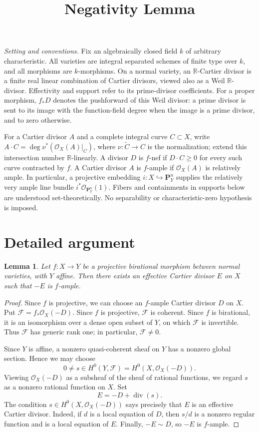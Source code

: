 \documentclass[12pt,a4paper,psamsfonts]{amsart}
\title[Negativity Lemma]{Negativity Lemma}
\author{}
\date{}
\theoremstyle{plain}
\newtheorem{lemma}[theorem]{Lemma}
\theoremstyle{definition}
\newcommand{\R}{\mathbb R}
\newcommand{\OO}{\mathcal O}
\begin{document}
\maketitle
{}

\noindent\textit{Setting and conventions.}
Fix an algebraically closed field $k$ of arbitrary characteristic.
All varieties are integral separated schemes of finite type over $k$,
and all morphisms are $k$-morphisms. On a normal variety, an
$\R$-Cartier divisor is a finite real linear combination of Cartier
divisors, viewed also as a Weil $\R$-divisor. Effectivity and support
refer to its prime-divisor coefficients. For a proper morphism,
$f_*D$ denotes the pushforward of this Weil divisor: a prime divisor
is sent to its image with the function-field degree when the image
is a prime divisor, and to zero otherwise.

For a Cartier divisor $A$ and a complete integral curve $C\subset X$,
write $A\cdot C=\deg\nu^*(\OO_X(A)|_C)$, where
$\nu\colon\widetilde C\to C$ is the normalization; extend this
intersection number $\R$-linearly. A divisor $D$ is $f$-nef if
$D\cdot C\geq0$ for every such curve contracted by $f$.
A Cartier divisor $A$ is $f$-ample if $\OO_X(A)$ is relatively ample.
In particular, a projective embedding
$i\colon X\hookrightarrow\mathbf P^n_Y$ supplies the relatively
very ample line bundle $i^*\OO_{\mathbf P^n_Y}(1)$.
Fibers and containments in supports below are understood
set-theoretically. No separability or characteristic-zero hypothesis
is imposed.

\section{Detailed argument}

\begin{lemma}\label{lem:antiample}
Let $f\colon X\to Y$ be a projective birational morphism between
normal varieties, with $Y$ affine. Then there exists an effective
Cartier divisor $E$ on $X$ such that $-E$ is $f$-ample.
\end{lemma}

\begin{proof}
Since $f$ is projective, we can choose an $f$-ample Cartier divisor
$D$ on $X$. Put $\mathcal F=f_*\OO_X(-D)$. Since $f$ is projective,
$\mathcal F$ is coherent. Since $f$ is birational, it is an
isomorphism over a dense open subset of $Y$, on which $\mathcal F$
is invertible. Thus $\mathcal F$ has generic rank one; in particular,
$\mathcal F\neq0$.

Since $Y$ is affine, a nonzero quasi-coherent sheaf on $Y$ has a
nonzero global section. Hence we may choose
\[
0\neq s\in H^0(Y,\mathcal F)=H^0(X,\OO_X(-D)).
\]
Viewing $\OO_X(-D)$ as a subsheaf of the sheaf of rational functions,
we regard $s$ as a nonzero rational function on $X$. Set
\[
E=-D+\operatorname{div}(s).
\]
The condition $s\in H^0(X,\OO_X(-D))$ says precisely that $E$ is
an effective Cartier divisor. Indeed, if $d$ is a local equation
of $D$, then $s/d$ is a nonzero regular function and is a local
equation of $E$. Finally, $-E\sim D$, so $-E$ is $f$-ample.
\end{proof}
\end{document}
